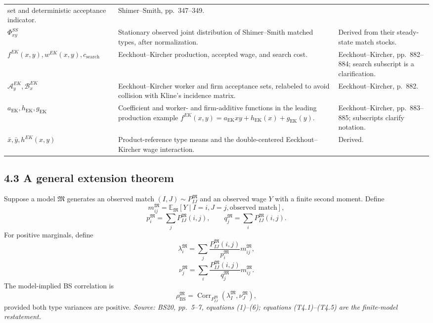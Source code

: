 \documentclass[11pt]{article}
\begin{document}
\begin{longtable}{p{}p{}p{}}
set and deterministic acceptance indicator. & Shimer--Smith,
pp.\ 347--349. \\
\(\Phi^{SS}_{xy}\) & Stationary observed joint distribution of
Shimer--Smith matched types, after normalization. & Derived from their
steady-state match stocks. \\
\(f^{EK}(x,y),w^{EK}(x,y),c_{\mathrm{search}}\) & Eeckhout--Kircher
production, accepted wage, and search cost. & Eeckhout--Kircher,
pp.\ 882--884; search subscript is a clarification. \\
\(\mathcal A_y^{EK},\mathcal B_x^{EK}\) & Eeckhout--Kircher worker and firm
acceptance sets, relabeled to avoid collision with Kline's incidence matrix. &
Eeckhout--Kircher, p.\ 882. \\
\(a_{\mathrm{EK}},h_{\mathrm{EK}},g_{\mathrm{EK}}\) & Coefficient and
worker- and firm-additive functions in the leading production example
\(f^{EK}(x,y)=a_{\mathrm{EK}}xy+h_{\mathrm{EK}}(x)+g_{\mathrm{EK}}(y)\). &
Eeckhout--Kircher, pp.\ 883--885; subscripts clarify notation. \\
\(\bar x,\bar y,h^{EK}(x,y)\) & Product-reference type means and the
double-centered Eeckhout--Kircher wage interaction. & Derived. \\
\end{longtable}

\subsection{4.3 A general extension theorem}

Suppose a model \(\mathfrak M\) generates an observed match
\((I,J)\sim P^{\mathfrak M}_{IJ}\) and an observed wage \(Y\) with a finite
second moment.  Define
\[
m^{\mathfrak M}_{ij}
=
\mathbb E_{\mathfrak M}[Y\mid I=i,J=j,\text{observed match}],
\tag{T4.1}
\]
\[
p_i^{\mathfrak M}=\sum_jP^{\mathfrak M}_{IJ}(i,j),
\qquad
q_j^{\mathfrak M}=\sum_iP^{\mathfrak M}_{IJ}(i,j).
\tag{T4.2}
\]
For positive marginals, define
\[
\lambda_i^{\mathfrak M}
=
\sum_j
\frac{P^{\mathfrak M}_{IJ}(i,j)}
{p_i^{\mathfrak M}}
m^{\mathfrak M}_{ij},
\tag{T4.3}
\]
\[
\nu_j^{\mathfrak M}
=
\sum_i
\frac{P^{\mathfrak M}_{IJ}(i,j)}
{q_j^{\mathfrak M}}
m^{\mathfrak M}_{ij}.
\tag{T4.4}
\]
The model-implied BS correlation is
\[
\rho_{\mathrm{BS}}^{\mathfrak M}
=
\operatorname{Corr}_{P^{\mathfrak M}_{IJ}}
\left(
\lambda_I^{\mathfrak M},
\nu_J^{\mathfrak M}
\right),
\tag{T4.5}
\]
provided both type variances are positive.
\textit{Source: BS20, pp.\ 5--7, equations (1)--(6); equations
(T4.1)--(T4.5) are the finite-model restatement.}
\end{document}
